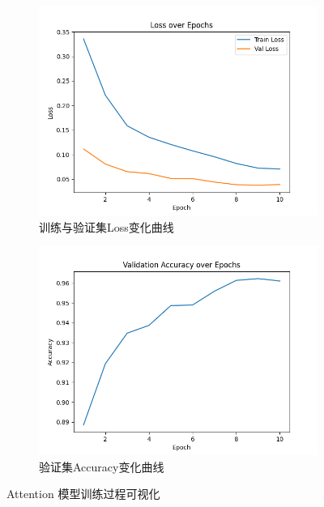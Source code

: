 \documentclass[11pt]{article}
\begin{document}
\begin{figure}[htbp]
    \centering
    \begin{subfigure}{0.45\textwidth}
        \centering
        \includegraphics[width=\textwidth]{../../result/train_loss_attention.png}
        \caption{训练与验证集Loss变化曲线}
    \end{subfigure}
    \hfill
    \begin{subfigure}{0.45\textwidth}
        \centering
        \includegraphics[width=\textwidth]{../../result/val_accuracy_attention.png}
        \caption{验证集Accuracy变化曲线}
    \end{subfigure}
    \caption{Attention 模型训练过程可视化}
\end{figure}
\end{document}
